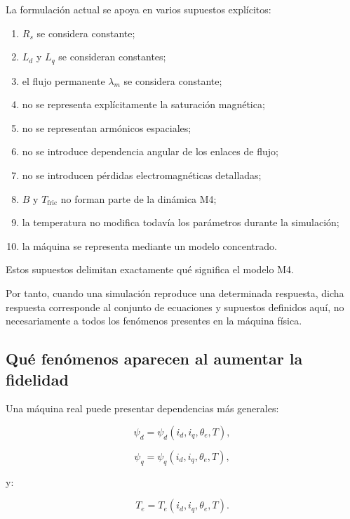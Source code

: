 La formulación actual se apoya en varios supuestos explícitos:

\begin{enumerate}
    \item $R_s$ se considera constante;
    \item $L_d$ y $L_q$ se consideran constantes;
    \item el flujo permanente $\lambda_m$ se considera constante;
    \item no se representa explícitamente la saturación magnética;
    \item no se representan armónicos espaciales;
    \item no se introduce dependencia angular de los enlaces de flujo;
    \item no se introducen pérdidas electromagnéticas detalladas;
    \item $B$ y $T_{\mathrm{fric}}$ no forman parte de la dinámica M4;
    \item la temperatura no modifica todavía los parámetros durante la simulación;
    \item la máquina se representa mediante un modelo concentrado.
\end{enumerate}

Estos supuestos delimitan exactamente qué significa el modelo M4.

Por tanto, cuando una simulación reproduce una determinada respuesta, dicha respuesta corresponde al conjunto de ecuaciones y supuestos definidos aquí, no necesariamente a todos los fenómenos presentes en la máquina física.

\subsection{Qué fenómenos aparecen al aumentar la fidelidad}

Una máquina real puede presentar dependencias más generales:

\begin{equation}
\psi_d
=
\psi_d(i_d,i_q,\theta_e,T),
\end{equation}

\begin{equation}
\psi_q
=
\psi_q(i_d,i_q,\theta_e,T),
\end{equation}

y:

\begin{equation}
T_e
=
T_e(i_d,i_q,\theta_e,T).
\end{equation}

